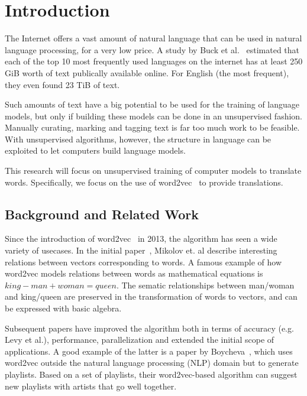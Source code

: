 \section{Introduction}
\label{sec:introduction}
The Internet offers a vast amount of natural language that can be used in natural language processing, for a very low price. A study by Buck et al.~\cite{buck2014n} estimated that each of the top 10 most frequently used languages on the internet has at least 250 GiB worth of text publically available online. For English (the most frequent), they even found 23 TiB of text.

Such amounts of text have a big potential to be used for the training of language models, but only if building these models can be done in an unsupervised fashion. Manually curating, marking and tagging text is far too much work to be feasible. With unsupervised algorithms, however, the structure in language can be exploited to let computers build language models.

This research will focus on unsupervised training of computer models to translate words. Specifically, we focus on the use of word2vec~\cite{mikolov2013efficient} to provide translations.


\subsection{Background and Related Work}
\label{sec:prior_work}
Since the introduction of word2vec~\cite{mikolov2013efficient, mikolov2013distributed} in 2013, the algorithm has seen a wide variety of usecases. In the initial paper~\cite{mikolov2013efficient}, Mikolov et. al describe interesting relations between vectors corresponding to words. 
A famous example of how word2vec models relations between words as mathematical equations is $king - man + woman = queen$.
The sematic relationships between man/woman and king/queen are preserved in the transformation of words to vectors, and can be expressed with basic algebra.

Subsequent papers have improved the algorithm both in terms of accuracy (e.g. Levy et al.\cite{levy2014linguistic}), performance, parallelization and extended the initial scope of applications. A good example of the latter is a paper by Boycheva~\cite{boycheva2015distributional}, which uses word2vec outside the natural language processing (NLP) domain but to generate playlists. Based on a set of playlists, their word2vec-based algorithm can suggest new playlists with artists that go well together.

